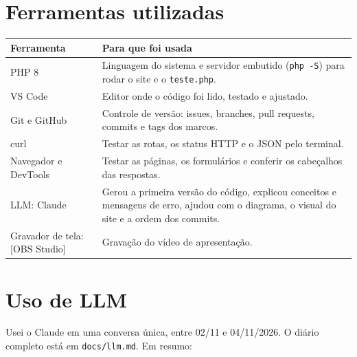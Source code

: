\documentclass[12pt,a4paper]{article}
\newcommand{\pendente}[1]{{\color{red}[#1]}}
\begin{document}
\section{Ferramentas utilizadas}

\begin{center}
\begin{tabularx}{\linewidth}{@{}lX@{}}
  \toprule
  \textbf{Ferramenta} & \textbf{Para que foi usada} \\
  \midrule
  PHP 8 & Linguagem do sistema e servidor embutido (\texttt{php -S}) para rodar o site e o \texttt{teste.php}. \\
  VS Code & Editor onde o código foi lido, testado e ajustado. \\
  Git e GitHub & Controle de versão: issues, branches, pull requests, commits e tags dos marcos. \\
  curl & Testar as rotas, os status HTTP e o JSON pelo terminal. \\
  Navegador e DevTools & Testar as páginas, os formulários e conferir os cabeçalhos das respostas. \\
  LLM: Claude & Gerou a primeira versão do código, explicou conceitos e mensagens de erro, ajudou com o diagrama, o visual do site e a ordem dos commits. \\
  Gravador de tela: \pendente{OBS Studio} & Gravação do vídeo de apresentação. \\
  \bottomrule
\end{tabularx}
\end{center}

\section{Uso de LLM}

Usei o Claude em uma conversa única, entre 02/11 e 04/11/2026. O diário completo está em \texttt{docs/llm.md}. Em resumo:
\end{document}
